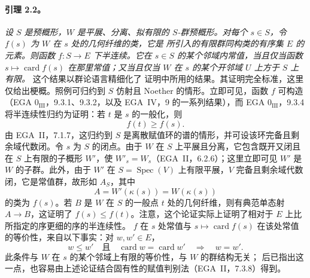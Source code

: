 \paragraph{\textbf{引理 2.2。}}
\emph{设 \(S\) 是预概形，\(W\) 是平展、分离、拟有限的 \(S\)-群预概形。对每个 \(s\in S\)，令 \(f(s)\) 为 \(W\) 在 \(s\) 处的几何纤维的类，它是  所引入的有限群同构类的有序集 \(E\) 的元素。则函数 \(f:S\to E\) 下半连续。它在 \(s\in S\) 的某个邻域内常值，当且仅当函数 \(s\mapsto\operatorname{card}f(s)\) 在那里常值；又当且仅当 \(W\) 在 \(s\) 的某个开邻域 \(U\) 上方于 \(S\) 上有限。}
这个结果以群论语言精细化了  证明中所用的结果。其证明完全标准，这里仅给出梗概。照例可归约到 \(S\) 仿射且 Noether 的情形。立即可见，函数 \(f\) 可构造（EGA \(0_{\mathrm{III}}\)，9.3.1、9.3.2，以及 EGA~IV，9 的一系列结果），而 EGA \(0_{\mathrm{III}}\)，9.3.4 将半连续性归约为证明：若 \(t\) 是 \(s\) 的一般化，则
\[
  f(t)\geq f(s).
\]
由 EGA~II，7.1.7，这归约到 \(S\) 是离散赋值环的谱的情形，并可设该环完备且剩余域代数闭。令 \(s\) 为 \(S\) 的闭点。由于 \(W\) 在 \(S\) 上平展且分离，它包含既开又闭且在 \(S\) 上有限的子概形 \(W'\)，使 \(W'_s=W_s\)（EGA~II，6.2.6）；这里立即可见 \(W'\) 是 \(W\) 的子群。此外，由于 \(W'\) 在 \(S=\operatorname{Spec}(V)\) 上有限平展，\(V\) 完备且剩余域代数闭，它是常值群，故形如 \(A_S\)，其中
\[
  A=W'(\kappa(s))=W(\kappa(s))
\]
的类为 \(f(s)\)。若 \(B\) 是 \(W\) 在 \(S\) 的一般点 \(t\) 处的几何纤维，则有典范单态射 \(A\to B\)，这证明了 \(f(s)\leq f(t)\)。注意，这个论证实际上证明了相对于 \(E\) 上比  所指定的序更细的序的半连续性。
\(f\) 在 \(s\) 处常值与 \(s\mapsto\operatorname{card}f(s)\) 在该处常值的等价性，来自以下事实：对 \(w,w'\in E\)，
\[
  w\leq w'
  \quad\text{且}\quad
  \operatorname{card}w=\operatorname{card}w'
  \quad\Longrightarrow\quad
  w=w'.
\]
此条件与 \(W\) 在 \(s\) 的某个邻域上有限的等价性，与 \(W\) 的群结构无关； 后已指出这一点，也容易由上述论证结合固有性的赋值判别法（EGA~II，7.3.8）得到。
